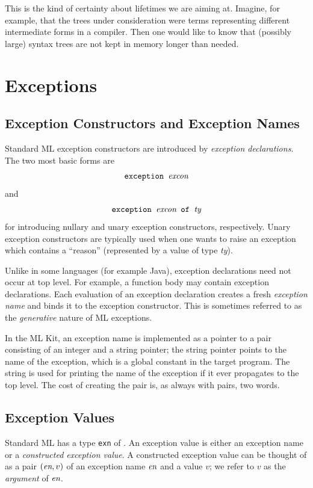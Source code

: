 \documentclass[12pt]{book}
\begin{document}
This is the kind of certainty about lifetimes we are aiming at.
Imagine, for example, that the trees under consideration 
were terms representing
different intermediate forms in a compiler. Then one would
like to know that (possibly large) syntax trees are not
kept in memory longer than needed.
%
\chapter{Exceptions}
%
\label{exceptions.sec}
\section{Exception Constructors and Exception Names}
Standard ML exception constructors are introduced by  
{\em exception declarations}. The two most basic forms are
$$\hbox{\tt exception {\it excon}}$$
and 
$$\hbox{\tt exception {\it excon} of {\it ty}}$$
for introducing nullary and unary exception constructors,
respectively. Unary exception constructors are typically
used when one wants to raise an exception which contains a
``reason'' (represented by a value of type {\it ty}).

Unlike in some languages (for example Java), exception
declarations need not occur at top level. For example,
a function body may contain exception declarations.
Each evaluation of an exception declaration creates a
fresh {\em exception name} and binds it to the exception
constructor. This is sometimes referred to as the {\em generative}
nature of ML exceptions.

In the ML Kit, an exception name is implemented
as a pointer to a pair consisting of an integer 
and a string pointer; the string pointer points
to the name of the exception, which is a global
constant in the target program. The string is used
for printing the name of the exception if it ever propagates
to the top level. The cost of creating
the pair is, as always with pairs, two words.

\section{Exception Values}
Standard ML has a type 
{\tt exn} of .
An exception value is  either an  
exception name 
or a 
{\em constructed exception value}. A constructed
exception value can be thought of as a pair $(\hbox{\it en},v)$  of
an exception name $\hbox{\it en}$ and a value $v$; we refer to  $v$ as the
{\em argument} of $\hbox{\it en}$.
\end{document}
